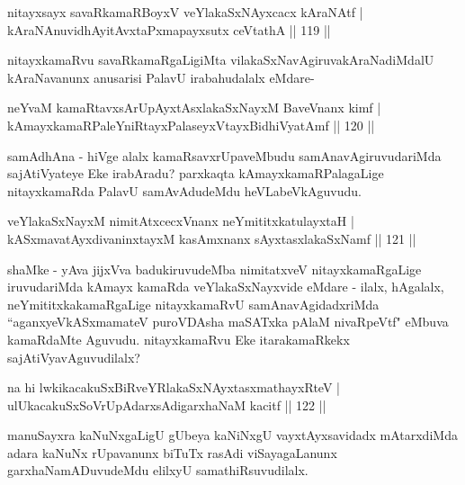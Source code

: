 \begin{shl}
nitayxsayx savaRkamaRBoyxV veYlakaSxNAyxcacx kAraNAtf |\\
kAraNAnuvidhAyitAvxtaPxmapayxsutx ceVtathA \hfill || 119 ||
\end{shl}

\begin{artha}
nitayxkamaRvu savaRkamaRgaLigiMta vilakaSxNavAgiruvakAraNadiMdalU kAraNavanunx anusarisi PalavU irabahudalalx eMdare-
\end{artha}


\begin{shl}
neYvaM kamaRtavxsArUpAyxtAsxlakaSxNayxM BaveVnanx kimf |\\
kAmayxkamaRPaleYniRtayxPalaseyxVtayxBidhiVyatAmf \hfill || 120 ||
\end{shl}

\begin{artha}
samAdhAna - hiVge alalx kamaRsavxrUpaveMbudu samAnavAgiruvudariMda sajAtiVyateye Eke irabAradu? parxkaqta kAmayxkamaRPalagaLige nitayxkamaRda PalavU samAvAdudeMdu heVLabeVkAguvudu.
\end{artha}

\begin{shl}
veYlakaSxNayxM nimitAtxcecxVnanx neYmititxkatulayxtaH |\\
kASxmavatAyxdivaninxtayxM kasAmxnanx sAyxtasxlakaSxNamf \hfill || 121 ||
\end{shl}

\begin{artha}
shaMke - yAva jijxVva badukiruvudeMba nimitatxveV nitayxkamaRgaLige iruvudariMda kAmayx kamaRda veYlakaSxNayxvide eMdare - ilalx, hAgalalx, neYmititxkakamaRgaLige nitayxkamaRvU samAnavAgidadxriMda ``aganxyeVkASxmamateV puroVDAsha maSATxka pAlaM nivaRpeVtf" eMbuva kamaRdaMte Aguvudu. nitayxkamaRvu Eke itarakamaRkekx sajAtiVyavAguvudilalx?
\end{artha}

\begin{shl}
na hi lwkikacakuSxBiRveYRlakaSxNAyxtasxmathayxRteV |\\
ulUkacakuSxSoV\s rUpAdarxsAdigarxhaNaM kacitf \hfill || 122 ||
\end{shl}

\begin{artha}
manuSayxra kaNuNxgaLigU gUbeya kaNiNxgU vayxtAyxsavidadx mAtarxdiMda adara kaNuNx rUpavanunx biTuTx rasAdi viSayagaLanunx garxhaNamADuvudeMdu elilxyU samathiRsuvudilalx.
\end{artha}

